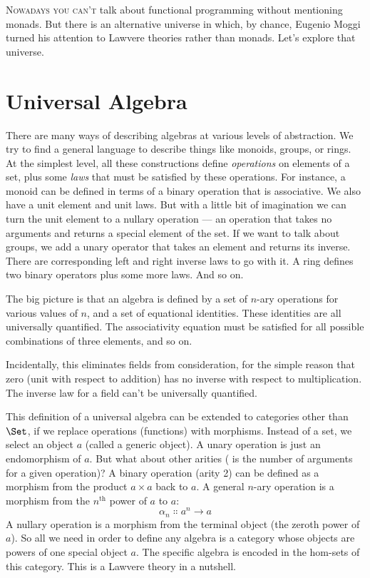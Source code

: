 
\lettrine[lhang=0.17]{N}{owadays you can't} talk about functional programming without mentioning
monads. But there is an alternative universe in which, by chance,
Eugenio Moggi turned his attention to Lawvere theories rather than
monads. Let's explore that universe.

\section{Universal Algebra}

There are many ways of describing algebras at various levels of
abstraction. We try to find a general language to describe things like
monoids, groups, or rings. At the simplest level, all these
constructions define \emph{operations} on elements of a set, plus some
\emph{laws} that must be satisfied by these operations. For instance, a
monoid can be defined in terms of a binary operation that is
associative. We also have a unit element and unit laws. But with a
little bit of imagination we can turn the unit element to a nullary
operation --- an operation that takes no arguments and returns a special
element of the set. If we want to talk about groups, we add a unary
operator that takes an element and returns its inverse. There are
corresponding left and right inverse laws to go with it. A ring defines
two binary operators plus some more laws. And so on.

The big picture is that an algebra is defined by a set of $n$-ary
operations for various values of $n$, and a set of equational identities.
These identities are all universally quantified. The associativity
equation must be satisfied for all possible combinations of three
elements, and so on.

Incidentally, this eliminates fields from consideration, for the simple
reason that zero (unit with respect to addition) has no inverse with
respect to multiplication. The inverse law for a field can't be
universally quantified.

This definition of a universal algebra can be extended to categories
other than $\Set$, if we replace operations (functions) with
morphisms. Instead of a set, we select an object $a$ (called a
generic object). A unary operation is just an endomorphism of
$a$. But what about other arities ( is the number of
arguments for a given operation)? A binary operation (arity 2) can be
defined as a morphism from the product $a\times{}a$ back to $a$.
A general $n$-ary operation is a morphism from the $n^\text{th}$ power of
$a$ to $a$:
\[\alpha_n \Colon a^n \to a\]
A nullary operation is a morphism from the terminal object (the zeroth
power of $a$). So all we need in order to define any algebra is a
category whose objects are powers of one special object $a$. The
specific algebra is encoded in the hom-sets of this category. This is a
Lawvere theory in a nutshell.

